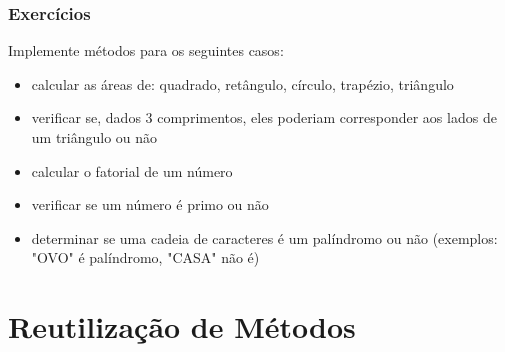 \documentclass[xcolor={dvipsnames,table},aspectratio=169]{beamer}
\begin{document}
\begin{frame}\frametitle{Exercícios}
Implemente métodos para os seguintes casos:
\begin{itemize}
	\item calcular as áreas de: quadrado, retângulo, círculo, trapézio, triângulo
	\item verificar se, dados 3 comprimentos, eles poderiam corresponder aos lados de um triângulo ou não
	\item calcular o fatorial de um número
	\item verificar se um número é primo ou não
        \item determinar se uma cadeia de caracteres é um palíndromo ou não (exemplos: "OVO" é palíndromo, "CASA" não é)
\end{itemize}
\end{frame}

\section{Reutilização de Métodos}
\end{document}

